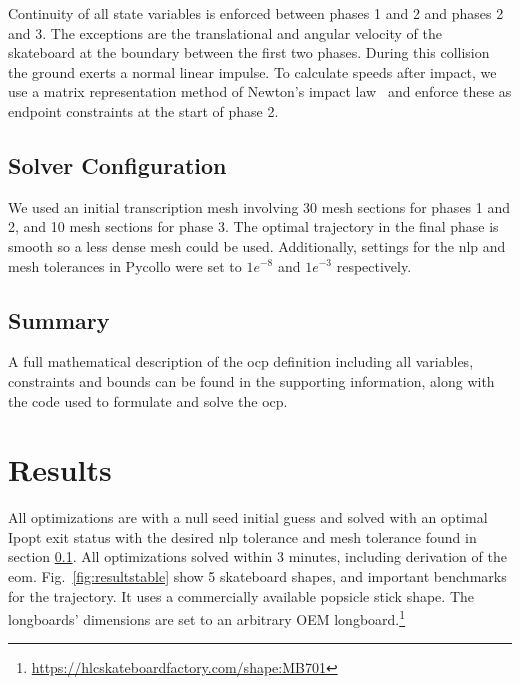 \documentclass[default,iicol]{sn-jnl}
\begin{document}
Continuity of all state variables is enforced between phases 1 and 2 and phases 2 and 3. The exceptions are the translational and angular velocity of the skateboard at the boundary between the first two phases. During this collision the ground exerts a normal linear impulse. To calculate speeds after impact, we use a matrix representation method of Newton's impact law~\cite{vallery_heike_advanced_2018} and enforce these as endpoint constraints at the start of phase 2.

\subsection{Solver Configuration}\label{s_settings}
We used an initial transcription mesh involving 30 mesh sections for phases 1 and 2, and 10 mesh sections for phase 3. The optimal trajectory in the final phase is smooth so a less dense mesh could be used.
Additionally, settings for the \gls{nlp} and mesh tolerances in Pycollo were set to $1e^{-8}$ and $1e^{-3}$ respectively.

\subsection{Summary}\label{s_summary}
A full mathematical description of the \gls{ocp} definition including all variables, constraints and bounds can be found in the supporting information, along with the code used to formulate and solve the \gls{ocp}.

\section{Results}
All optimizations are with a null seed initial guess and solved with an optimal Ipopt exit status with the desired \gls{nlp} tolerance and mesh tolerance found in section \ref{s_settings}. All optimizations solved within 3 minutes, including derivation of the \gls{eom}. Fig.~\ref{fig:resultstable} show 5 skateboard shapes, and important benchmarks for the trajectory. It uses a commercially available popsicle stick shape. The longboards' dimensions are set to an arbitrary OEM longboard.\footnote{\url{https://hlcskateboardfactory.com/shape:MB701}}
\end{document}
